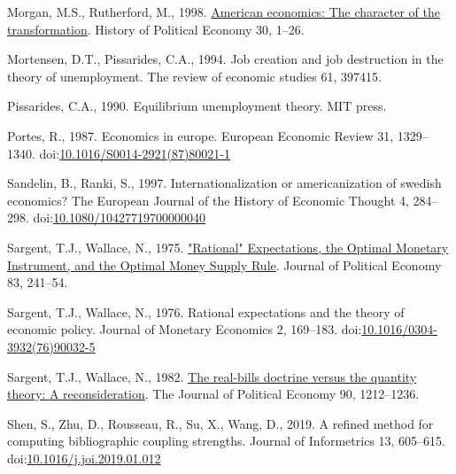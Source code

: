 \documentclass[]{elsarticle} %
\newlength{\cslhangindent}
\newlength{\cslentryspacingunit} %
\newenvironment{CSLReferences}[2] %
 {%
  \setlength{\parindent}{0pt}
  \ifodd #1
  \let\oldpar\par
  \def\par{\hangindent=\cslhangindent\oldpar}
  \fi
  \setlength{\parskip}{#2\cslentryspacingunit}
 }%
 {}
\begin{document}
\begin{CSLReferences}{1}{0}
\leavevmode{}%
Morgan, M.S., Rutherford, M., 1998.
\href{http://search.ebscohost.com/login.aspx?direct=true\&db=bth\&AN=7752144\&lang=fr\&site=ehost-live}{American
economics: The character of the transformation}. History of Political
Economy 30, 1--26.

\leavevmode{}%
Mortensen, D.T., Pissarides, C.A., 1994. Job creation and job
destruction in the theory of unemployment. The review of economic
studies 61, 397415.

\leavevmode{}%
Pissarides, C.A., 1990. Equilibrium unemployment theory. MIT press.

\leavevmode{}%
Portes, R., 1987. Economics in europe. European Economic Review 31,
1329--1340.
doi:\href{https://doi.org/10.1016/S0014-2921(87)80021-1}{10.1016/S0014-2921(87)80021-1}

\leavevmode{}%
Sandelin, B., Ranki, S., 1997. Internationalization or americanization
of swedish economics? The European Journal of the History of Economic
Thought 4, 284--298.
doi:\href{https://doi.org/10.1080/10427719700000040}{10.1080/10427719700000040}

\leavevmode{}%
Sargent, T.J., Wallace, N., 1975.
\href{http://econpapers.repec.org/article/ucpjpolec/v_3A83_3Ay_3A1975_3Ai_3A2_3Ap_3A241-54.htm}{"{Rational}"
{Expectations}, the {Optimal} {Monetary} {Instrument}, and the {Optimal}
{Money} {Supply} {Rule}}. Journal of Political Economy 83, 241--54.

\leavevmode{}%
Sargent, T.J., Wallace, N., 1976. Rational expectations and the theory
of economic policy. Journal of Monetary Economics 2, 169--183.
doi:\href{https://doi.org/10.1016/0304-3932(76)90032-5}{10.1016/0304-3932(76)90032-5}

\leavevmode{}%
Sargent, T.J., Wallace, N., 1982.
\href{http://www.jstor.org/stable/1830945}{The real-bills doctrine
versus the quantity theory: {A} reconsideration}. The Journal of
Political Economy 90, 1212--1236.

\leavevmode{}%
Shen, S., Zhu, D., Rousseau, R., Su, X., Wang, D., 2019. A refined
method for computing bibliographic coupling strengths. Journal of
Informetrics 13, 605--615.
doi:\href{https://doi.org/10.1016/j.joi.2019.01.012}{10.1016/j.joi.2019.01.012}


\end{CSLReferences}
\end{document}
